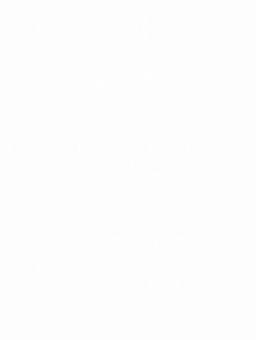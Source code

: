 \documentclass[12pt,portrait,semhelv,semrot]{article}
\begin{document}
	\normalsize

\textcolor{white}{\textbf{
$$\boldsymbol{P(A \mid B)  = \frac{P(A \cap B)}{P(B)} }$$
$$\boldsymbol{P(A \mid B)  = P(A) \mbox{ and } P(B\mid A) = P(B)}$$
$$\boldsymbol{P(A \mid B)  = P(A)}$$
$$\boldsymbol{P(B\mid A) = P(B)}$$
$$\boldsymbol{P(A\cap B) = P(A)P(B)}$$
$$\boldsymbol{\chi^2 = \sum_{rows}\sum_{columns}\frac{(Observed-Expected)^2}{Expected}}$$
$$\boldsymbol{Y\sim exp(1/10)}$$
$$\boldsymbol{f_Y(y) = \begin{cases} (1/10)e^{-y/10} & y >0 \\ 0 & otherwise\end{cases}}$$
$$\boldsymbol{P(Y>2) = \int_2^{\infty}(1/10)e^{-y/10}dy = 0.8187}$$
$$\boldsymbol{P(Y>2) = 1-P(Y\leq 2) = 1-F(2) = 1-(1 - e^{-2/10})}$$
$$\boldsymbol{P(Y\leq y) = \int_{-\infty}^yf(y)dy = \begin{cases} 0 & y\leq 0\\ \int_0^{y} \lambda e^{-\lambda t}dt = 1-e^{-\lambda y} & y > 0\end{cases}}$$
$$\boldsymbol{Y\sim \chi^2(k)}$$
$$\boldsymbol{f(y) = \begin{cases}\frac{1}{2^{k/2}\Gamma(k/2)}y^{k/2}e^{-y/2} & y>0 \\ 0 & otherwise\end{cases}}$$
$$\boldsymbol{P(Cell_{i,j}) = P(row_i)P(column_j)}$$
$$\boldsymbol{E(Cell_{i,j}) = n\left(\frac{row_i~total}{n}\right)\left(\frac{column_j~total}{n}\right)}$$
$$\boldsymbol{E(Cell_{i,j}) = \frac{(row_i~total)*(column_j~total)}{n}}$$
$$\boldsymbol{\chi^2 = \sum_{i = 1}^I\sum_{j =1}^J\frac{(Cell_{i,j}-E(Cell_{i,j}))^2}{E(Cell_{i,j})}}$$
$$\boldsymbol{\chi^2 = \sum_{i = 1}^I\sum_{j =1}^J\frac{(Cell_{i,j}-E(Cell_{i,j}))^2}{E(Cell_{i,j})}\sim\chi^2_{(I-1)(J-1)}}$$
}}
\end{document}
